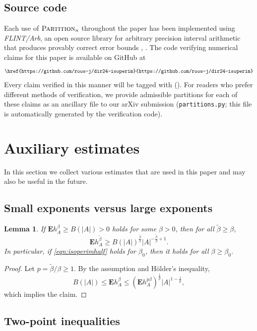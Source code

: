\documentclass[12pt]{amsart}
\theoremstyle{plain}
\newtheorem{lem}[thm]{Lemma}
\theoremstyle{definition}
\theoremstyle{remark}
\numberwithin{equation}{section}
\begin{document}
\subsection{Source code}
Each use of $\textsc{Partition}_n$ throughout the paper has been implemented using \emph{FLINT/Arb}, an open source library for arbitrary precision interval arithmetic that produces provably correct error bounds \cite{Arb}, \cite{Flint}.
The code verifying numerical claims for this paper is available on GitHub at
\[
\texttt{\href{https://github.com/roos-j/dir24-isoperim}{https://github.com/roos-j/dir24-isoperim}}
\]
Every claim verified in this manner will be tagged with ({\tiny\faCar}).
For readers who prefer different methods of verification, we provide admissible partitions for each of these claims as an ancillary file to our arXiv submission (\texttt{partitions.py}; this file is automatically generated by the verification code).\\

\section{Auxiliary estimates}\label{sec:prelim}
In this section we collect various estimates that are used in this paper and may also be useful in the future.

\subsection{Small exponents versus large exponents}

\begin{lem}\label{lem:holder}
If $\mathbf{E} h_A^\beta\ge B(|A|)>0$ holds for some $\beta>0$, then for all $\tilde{\beta}\ge \beta$,
\[ \mathbf{E} h_A^{\tilde{\beta}}\ge B(|A|)^{\frac{\tilde{\beta}}\beta} |A|^{-\frac{\tilde{\beta}}{\beta}+1}. \]
In particular, if \eqref{eqn:isoperimhalf} holds for $\beta_0$, then it holds for all $\beta\ge \beta_0$.
\end{lem}
\begin{proof}
Let $p=\tilde{\beta}/\beta\ge 1$. By the assumption and H\"older's inequality,
\[ B(|A|)\le \mathbf{E} h_A^{\beta} \le (\mathbf{E} h_A^{p\beta})^{\frac1p} |A|^{1-\frac1p}, \]
which implies the claim.
\end{proof}

\subsection{Two-point inequalities}
\end{document}
